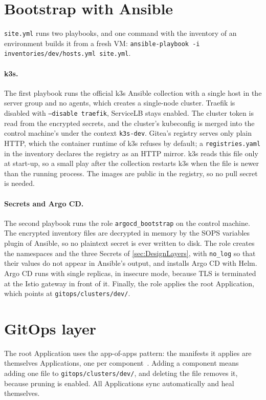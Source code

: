 \section{Bootstrap with Ansible}
\label{sec:ImplBootstrap}
\texttt{site.yml} runs two playbooks, and one command with the inventory of an environment builds it from a fresh VM: \texttt{ansible-playbook -i inventories/dev/hosts.yml site.yml}.

\paragraph{k3s.} The first playbook runs the official k3s Ansible collection with a single host in the server group and no agents, which creates a single-node cluster. Traefik is disabled with \texttt{--disable traefik}, ServiceLB stays enabled. The cluster token is read from the encrypted secrets, and the cluster's kubeconfig is merged into the control machine's under the context \texttt{k3s-dev}. Gitea's registry serves only plain HTTP, which the container runtime of k3s refuses by default; a \texttt{registries.yaml} in the inventory declares the registry as an HTTP mirror. k3s reads this file only at start-up, so a small play after the collection restarts k3s when the file is newer than the running process. The images are public in the registry, so no pull secret is needed.

\paragraph{Secrets and Argo CD.} The second playbook runs the role \texttt{argocd\_bootstrap} on the control machine. The encrypted inventory files are decrypted in memory by the SOPS variables plugin of Ansible, so no plaintext secret is ever written to disk. The role creates the namespaces and the three Secrets of \autoref{sec:DesignLayers}, with \texttt{no\_log} so that their values do not appear in Ansible's output, and installs Argo CD with Helm. Argo CD runs with single replicas, in insecure mode, because TLS is terminated at the Istio gateway in front of it. Finally, the role applies the root Application, which points at \texttt{gitops/clusters/dev/}.

\section{GitOps layer}
\label{sec:ImplGitOps}
The root Application uses the app-of-apps pattern: the manifests it applies are themselves Applications, one per component~\cite{ArgoCDBootstrap}. Adding a component means adding one file to \texttt{gitops/clusters/dev/}, and deleting the file removes it, because pruning is enabled. All Applications sync automatically and heal themselves.

